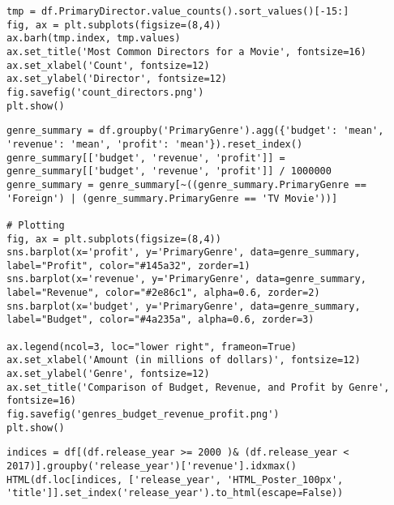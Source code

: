 \begin{lstlisting}
tmp = df.PrimaryDirector.value_counts().sort_values()[-15:]
fig, ax = plt.subplots(figsize=(8,4))
ax.barh(tmp.index, tmp.values)
ax.set_title('Most Common Directors for a Movie', fontsize=16)
ax.set_xlabel('Count', fontsize=12)
ax.set_ylabel('Director', fontsize=12)
fig.savefig('count_directors.png')
plt.show()
\end{lstlisting}

\begin{lstlisting}
genre_summary = df.groupby('PrimaryGenre').agg({'budget': 'mean', 'revenue': 'mean', 'profit': 'mean'}).reset_index()
genre_summary[['budget', 'revenue', 'profit']] = genre_summary[['budget', 'revenue', 'profit']] / 1000000
genre_summary = genre_summary[~((genre_summary.PrimaryGenre ==  'Foreign') | (genre_summary.PrimaryGenre == 'TV Movie'))]

# Plotting
fig, ax = plt.subplots(figsize=(8,4))
sns.barplot(x='profit', y='PrimaryGenre', data=genre_summary, label="Profit", color="#145a32", zorder=1)
sns.barplot(x='revenue', y='PrimaryGenre', data=genre_summary, label="Revenue", color="#2e86c1", alpha=0.6, zorder=2)
sns.barplot(x='budget', y='PrimaryGenre', data=genre_summary, label="Budget", color="#4a235a", alpha=0.6, zorder=3)

ax.legend(ncol=3, loc="lower right", frameon=True)
ax.set_xlabel('Amount (in millions of dollars)', fontsize=12)
ax.set_ylabel('Genre', fontsize=12)
ax.set_title('Comparison of Budget, Revenue, and Profit by Genre', fontsize=16)
fig.savefig('genres_budget_revenue_profit.png')
plt.show()
\end{lstlisting}

\begin{lstlisting}
indices = df[(df.release_year >= 2000 )& (df.release_year < 2017)].groupby('release_year')['revenue'].idxmax()
HTML(df.loc[indices, ['release_year', 'HTML_Poster_100px', 'title']].set_index('release_year').to_html(escape=False))
\end{lstlisting}

